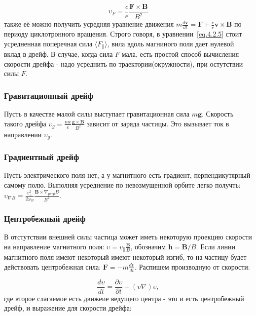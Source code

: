 \documentclass[10pt, a4paper]{article}
\begin{document}
\begin{equation}
    \label{eq.4.2.5}
    \upsilon_F=\frac{c}{e} \frac{\mathbf{F} \times \mathbf{B}}{B^2}
\end{equation}
также её можно получить усредняя уравнение движения $m\frac{d\mathbf{v}}{dt}=\mathbf{F} + \frac{e}{c} \mathbf{v}\times\mathbf{B}$
по периоду циклотронного вращения. Строго говоря, в уравнении~\ref{eq.4.2.5} стоит усредненная поперечная сила 
$\langle F_{\parallel} \rangle$, вила вдоль магниного поля дает нулевой вклад в дрейф. В случае, когда сила $F$ мала, есть
простой способ вычисления скорости дрейфа - надо усреднить по траектории(окружности), при остутствии силы $F$.

\subsubsection{Гравитационный дрейф}
\label{sec.4.2.3}

Пусть в качестве малой силы выступает гравитационная сила $m\mathbf{g}$. Скорость такого дрейфа 
$\upsilon_g=\frac{mc}{e} \frac{\mathbf{g}\times\mathbf{B}}{B^2}$ зависит от заряда частицы. Это вызывает ток в направлении $\upsilon_g$.

\subsubsection{Градиентный дрейф}
\label{sec.4.2.4}

Пусть электрического поля нет, а у магнитного есть градиент, перпендикутярный самому полю. Выполняя усреднение по
невозмущенной орбите легко получть: $\upsilon_{\nabla B}=\frac{v_{\perp}^2}{2\omega_B} \frac{\mathbf{B}\times\nabla_{perp}B }{B^2}$.

\subsubsection{Центробежный дрейф}
\label{sec.4.2.5}
В отстутствии внешней силы частица может иметь некоторую проекцию скорости на направление магнитного поля:
$\upsilon=v_{\parallel}  \frac{\mathbf{B}}{B}$, обозначим $\mathbf{h}= \mathbf{B}/B$. Если линии магнитного поля имеют некоторый
имеют некоторый изгиб, то на частицу будет действовать центробежная сила: $\mathbf{F}=-m\frac{d\upsilon}{dt}$. Распишем
производную от скорости:

\begin{equation}
    \label{eq.4.2.5-u}
    \frac{d\upsilon}{dt}=\frac{\partial \upsilon}{\partial t} + (\upsilon \nabla) \upsilon,
\end{equation}
где второе слагаемое есть движеие ведущего центра - это и есть центробежный дрейф, и выражение для скорости дрейфа:
\end{document}
